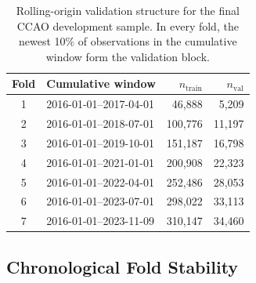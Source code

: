 \documentclass[10pt]{article}
\theoremstyle{definition}
\newcommand{\1}{\mathbf{1}}
\begin{document}
{
\begin{table}[!ht]
\centering
\caption{Rolling-origin validation structure for the final CCAO development sample. In every fold, the newest 10\% of observations in the cumulative window form the validation block.}
\label{tab:fold_structure}
\begin{tabular}{clrr}
\toprule
Fold & Cumulative window & $n_{\mathrm{train}}$ & $n_{\mathrm{val}}$ \\
\midrule
1 & 2016-01-01--2017-04-01 & 46,888 & 5,209 \\
2 & 2016-01-01--2018-07-01 & 100,776 & 11,197 \\
3 & 2016-01-01--2019-10-01 & 151,187 & 16,798 \\
4 & 2016-01-01--2021-01-01 & 200,908 & 22,323 \\
5 & 2016-01-01--2022-04-01 & 252,486 & 28,053 \\
6 & 2016-01-01--2023-07-01 & 298,022 & 33,113 \\
7 & 2016-01-01--2023-11-09 & 310,147 & 34,460 \\
\bottomrule
\end{tabular}
\end{table}
}

\subsection{Chronological Fold Stability}
\end{document}

